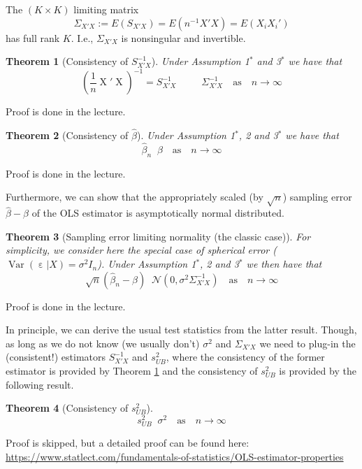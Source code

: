 \documentclass[
  14pt,
]{memoir}
\DeclareMathOperator{\eps}{\varepsilon}
\DeclareMathOperator{\V}{\operatorname{Var}}
\DeclareMathOperator{\X}{X}
\DeclareMathOperator{\toprob}{\overset{p}{\longrightarrow}}
\DeclareMathOperator{\todistr}{\overset{d}{\longrightarrow}}
\newtheorem{theorem}{Theorem}[section]
\begin{document}
The \((K\times K)\) limiting matrix
\[\Sigma_{X'X}:=E(S_{X'X})=E(n^{-1}X'X)=E(X_iX_i')\]
has full rank \(K\). I.e., \(\Sigma_{X'X}\) is nonsingular and invertible.

\bigskip

\begin{theorem}[Consistency of $S_{X'X}^{-1}$]\label{Sxx1} Under Assumption 1$^\ast$ and 3$^\ast$ we have that
$$\left(\frac{1}{n}\X'\X\right)^{-1}=S_{X'X}^{-1}\quad\toprob\quad\Sigma_{X'X}^{-1}\quad\text{as}\quad n\to\infty$$
\end{theorem}

\noindent Proof is done in the lecture.

\begin{theorem}[Consistency of $\hat\beta$]\label{bconsistent1} Under Assumption 1$^\ast$, 2 and 3$^\ast$ we have that
$$\hat\beta_n\toprob\beta\quad\text{as}\quad n\to\infty$$
\end{theorem}

\noindent Proof is done in the lecture.

Furthermore, we can show that the appropriately scaled (by \(\sqrt{n}\)) sampling error \(\hat\beta-\beta\) of the OLS estimator is asymptotically normal distributed.

\begin{theorem}[Sampling error limiting normality (the classic case)]\label{OLSnormality1} 
For simplicity, we consider here the special case of spherical error ($\V(\eps|X)=\sigma^2I_n$). Under Assumption 1$^\ast$, 2 and 3$^\ast$ we then have that
$$\sqrt{n}(\hat\beta_n-\beta)\todistr \mathcal{N}\left(0,\sigma^2 \Sigma^{-1}_{X'X}\right)\quad\text{as}\quad n\to\infty$$
\end{theorem}

\noindent Proof is done in the lecture.

In principle, we can derive the usual test statistics from the latter result. Though, as long as we do not know (we usually don't) \(\sigma^2\) and \(\Sigma_{X'X}\) we need to plug-in the (consistent!) estimators \(S_{X'X}^{-1}\) and \(s_{UB}^2\), where the consistency of the former estimator is provided by Theorem \ref{Sxx1} and the consistency of \(s_{UB}^2\) is provided by the following result.

\begin{theorem}[Consistency of $s^2_{UB}$]\label{Consistency_s1}
$$s_{UB}^2\toprob\sigma^2\quad\text{as}\quad n\to\infty$$
\end{theorem}

\noindent Proof is skipped, but a detailed proof can be found here: \url{https://www.statlect.com/fundamentals-of-statistics/OLS-estimator-properties}
\end{document}
